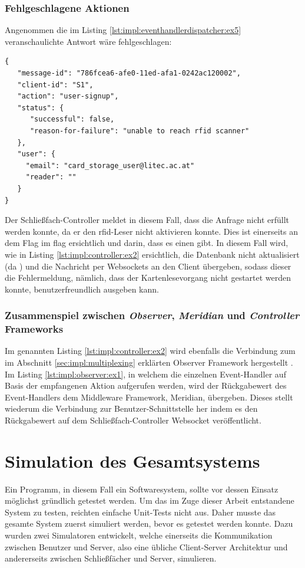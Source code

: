 \subsubsection{Fehlgeschlagene Aktionen}
Angenommen die im Listing \ref{lst:impl:eventhandlerdispatcher:ex5} veranschaulichte Antwort wäre fehlgeschlagen:
\begin{lstlisting}[style=goMono,label={lst:impl:eventhandlerdispatcher:ex6},caption={\centering Antwort: Ausformulierte JSON-Repräsentation einer Benutzer Registrierung}]
{
   "message-id": "786fcea6-afe0-11ed-afa1-0242ac120002",
   "client-id": "S1",   
   "action": "user-signup",
   "status": {
      "successful": false,
      "reason-for-failure": "unable to reach rfid scanner"
   },
   "user": {
     "email": "card_storage_user@litec.ac.at"
     "reader": ""
   }
}
\end{lstlisting}
Der Schließfach-Controller meldet in diesem Fall, dass die Anfrage nicht erfüllt werden konnte, da er den \acrshort{rfid}-Leser nicht aktivieren konnte. Dies ist einerseits an dem  Flag im  flag ersichtlich und darin, dass es einen  gibt. In diesem Fall wird, wie in Listing \ref{lst:impl:controller:ex2} ersichtlich, die Datenbank nicht aktualisiert  (da ) und die Nachricht per Websockets an den Client übergeben, sodass dieser die Fehlermeldung, nämlich, dass der Kartenlesevorgang nicht gestartet werden konnte, benutzerfreundlich ausgeben kann.

\subsubsection{Zusammenspiel zwischen \textit{Observer}, \textit{Meridian} und \textit{Controller} Frameworks}
Im genannten Listing \ref{lst:impl:controller:ex2} wird ebenfalls die Verbindung zum im Abschnitt \ref{sec:impl:multiplexing} erklärten Observer Framework hergestellt . Im Listing \ref{lst:impl:observer:ex1}, in welchem die einzelnen Event-Handler auf Basis der empfangenen Aktion aufgerufen werden, wird der Rückgabewert des Event-Handlers  dem Middleware Framework, Meridian, übergeben. Dieses stellt wiederum die Verbindung zur Benutzer-Schnittstelle her indem es den Rückgabewert  auf dem Schließfach-Controller Websocket  veröffentlicht.

 \newpage
\section{Simulation des Gesamtsystems}\label{sec:impl:simulators}
Ein Programm, in diesem Fall ein Softwaresystem, sollte vor dessen Einsatz möglichst gründlich getestet werden. Um das im Zuge dieser Arbeit entstandene System zu testen, reichten einfache Unit-Tests nicht aus. Daher musste das gesamte System zuerst simuliert werden, bevor es getestet werden konnte. Dazu wurden zwei Simulatoren entwickelt, welche einerseits die Kommunikation zwischen Benutzer und Server, also eine übliche Client-Server Architektur und andererseits zwischen Schließfächer und Server, simulieren.\bigskip

